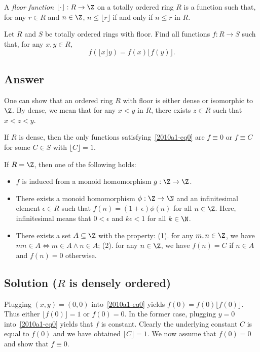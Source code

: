 A \emph{floor function} $\lfloor \cdot \rfloor : R \to \Z$ on a totally ordered ring $R$ is a function such that, for any $r \in R$ and $n \in \Z$, $n \leq \lfloor r \rfloor$ if and only if $n \leq r$ in $R$.

Let $R$ and $S$ be totally ordered rings with floor.
Find all functions $f : R \to S$ such that, for any $x, y \in R$,
\[ f(\lfloor x \rfloor y) = f(x) \lfloor f(y) \rfloor. \tag{*}\label{2010a1-eq0} \]



\subsection*{Answer}

One can show that an ordered ring $R$ with floor is either dense or isomorphic to $\Z$.
By dense, we mean that for any $x < y$ in $R$, there exists $z \in R$ such that $x < z < y$.

If $R$ is dense, then the only functions satisfying~\eqref{2010a1-eq0} are $f \equiv 0$ or $f \equiv C$ for some $C \in S$ with $\lfloor C \rfloor = 1$.

If $R = \Z$, then one of the following holds:
\begin{itemize}

    \item
    $f$ is induced from a monoid homomorphism $g : \Z \to \Z$.
    
    \item
    There exists a monoid homomorphism $\phi : \Z \to \N$ and an infinitesimal element $\epsilon \in R$ such that $f(n) = (1 + \epsilon) \phi(n)$ for all $n \in \Z$.
    Here, infinitesimal means that $0 < \epsilon$ and $k \epsilon < 1$ for all $k \in \N$.

    \item
    There exists a set $A \subseteq \Z$ with the property:
    (1). for any $m, n \in \Z$, we have $mn \in A \iff m \in A \wedge n \in A$;
    (2). for any $n \in \Z$, we have $f(n) = C$ if $n \in A$ and $f(n) = 0$ otherwise.

\end{itemize}





\subsection*{Solution ($R$ is densely ordered)}

Plugging $(x, y) = (0, 0)$ into~\eqref{2010a1-eq0} yields $f(0) = f(0) \lfloor f(0) \rfloor$.
Thus either $\lfloor f(0) \rfloor = 1$ or $f(0) = 0$.
In the former case, plugging $y = 0$ into~\eqref{2010a1-eq0} yields that $f$ is constant.
Clearly the underlying constant $C$ is equal to $f(0)$ and we have obtained $\lfloor C \rfloor = 1$.
We now assume that $f(0) = 0$ and show that $f \equiv 0$.

